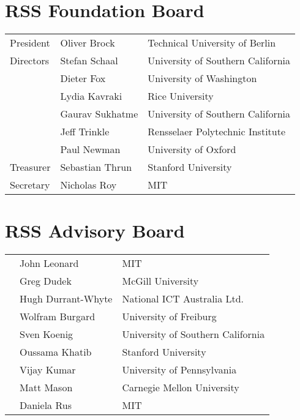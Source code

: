 \vspace{0.5cm}
\section{RSS Foundation Board}

\begin{tabular}{>{\raggedleft}p{5cm}p{4.5cm}>{\small}p{7cm}}
President & Oliver Brock & Technical University of Berlin\\
Directors & Stefan Schaal & University of Southern California\\
& Dieter Fox & University of Washington\\
& Lydia Kavraki & Rice University \\
& Gaurav Sukhatme & University of Southern California \\
& Jeff Trinkle & Rensselaer Polytechnic Institute \\
& Paul Newman & University of Oxford \\
Treasurer & Sebastian Thrun & Stanford University\\
Secretary & Nicholas Roy & MIT\\
\end{tabular}

\vspace{0.5cm}
\section{RSS Advisory Board}

\begin{tabular}{>{\raggedleft}p{5cm}p{4.5cm}>{\small}p{7cm}}
& John Leonard & MIT\\
& Greg Dudek & McGill University \\
&Hugh Durrant-Whyte &National ICT Australia Ltd.\\
&Wolfram Burgard &University of Freiburg\\
&Sven Koenig&University of Southern California\\
&Oussama Khatib&Stanford University\\
&Vijay Kumar&University of Pennsylvania\\
&Matt Mason&Carnegie Mellon University\\
&Daniela Rus&MIT\\
\end{tabular}

%
%
